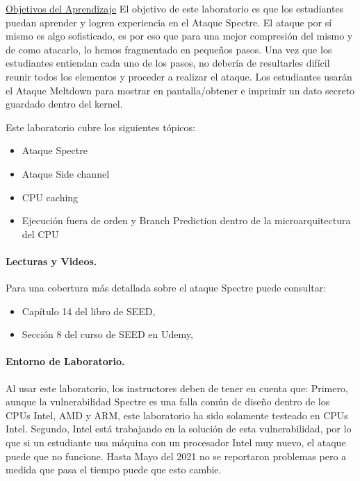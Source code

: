 \underline{Objetivos del Aprendizaje} El objetivo de este laboratorio es que los estudiantes puedan aprender y logren experiencia en el Ataque Spectre. El ataque por sí mismo es algo sofisticado, es por eso que para una mejor compresión del mismo y de como atacarlo, lo hemos fragmentado en pequeños pasos. Una vez que los estudiantes entiendan cada uno de los pasos, no debería de resultarles difícil reunir todos los elementos y proceder a realizar el ataque. Los estudiantes usarán el Ataque Meltdown para mostrar en pantalla/obtener e imprimir un dato secreto guardado dentro del kernel.

Este laboratorio cubre los siguientes tópicos:


\begin{itemize}[noitemsep]
\item Ataque Spectre
\item Ataque Side channel
\item CPU caching
\item Ejecución fuera de orden y Branch Prediction dentro de la microarquitectura del CPU
\end{itemize}



\paragraph{Lecturas y Videos.}
Para una cobertura más detallada sobre el ataque Spectre puede consultar:

\begin{itemize}
\item Capítulo 14 del libro de SEED, \seedbook
\item Sección 8 del curso de SEED en Udemy, \seedcsvideo
\end{itemize}


\paragraph{Entorno de Laboratorio.} \seedenvironmentAB

Al usar este laboratorio, los instructores deben de tener en cuenta que:
Primero, aunque la vulnerabilidad Spectre es una falla común de diseño dentro de los CPUs Intel, AMD y ARM, este laboratorio ha sido solamente testeado en CPUs Intel.
Segundo, Intel está trabajando en la solución de esta vulnerabilidad, por lo que si un estudiante usa máquina con un procesador Intel muy nuevo, el ataque puede que no funcione. Hasta Mayo del 2021 no se reportaron problemas pero a medida que pasa el tiempo puede que esto cambie.

